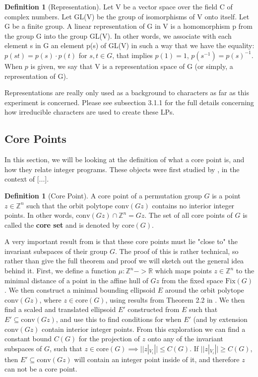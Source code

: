 \documentclass[11pt]{article} %
\theoremstyle{definition}
\newtheorem{definition}[theorem]{Definition}
\theoremstyle{remark}
\newcommand{\ZZ}{\mathbb{Z}}
\newcommand{\RR}{\mathbb{R}}
\begin{document}
\begin{definition} [Representation]
Let V be a vector space over the field C of complex numbers.
Let GL(V) be the group of isomorphisms of V onto itself.
Let G be a finite group.
A linear representation of G in V is a homomorphism p from the group G into the group GL(V). In other words, we associate with each element s in G an element p(s) of GL(V) in such a way that we have the equality: $ p(st) = p(s) \cdot p(t)$ for $s, t \in G$, that implies $p(1) = 1$, $p(s^{-1}) = p(s)^{-1}$. When $p$ is given, we say that V is a representation space of G (or simply, a representation of G).
\end{definition}

Representations are really only used as a background to characters as far as this experiment is concerned. Please see subsection 3.1.1 for the full details concerning how irreducible characters are used to create these LPs.

\subsection{Core Points}

In this section, we will be looking at the definition of what a core point is, and how they relate integer programs. These objects were first studied by \cite{some}, in the context of [...].

\begin{definition}[Core Point]
A core point of a permutation group $G$ is a point $z \in \mathbb{Z}^n$ such that the orbit polytope $\textrm{conv}(Gz)$ contains no interior integer points. In other words, $\textrm{conv}(Gz) \cap \mathbb{Z}^n = Gz$. The set of all core points of $G$ is called the \textbf{core set} and is denoted by $\textrm{core}(G)$.
\end{definition}

A very important result from \cite{rehn} is that these core points must lie "close to" the invariant subspaces of their group $G$. The proof of this is rather technical, so rather than give the full theorem and proof we will sketch out the general idea behind it. First, we define a function $\mu : \ZZ^n -> \RR$ which maps points $z \in \ZZ^n$ to the minimal distance of a point in the affine hull of $Gz$ from the fixed space $\textrm{Fix}(G)$. We then construct a minimal bounding ellipsoid $E$ around the orbit polytope $\textrm{conv}(Gz)$, where $z \in \textrm{core}(G)$, using results from Theorem 2.2 in \cite{barvinok/blekherman}. We then find a scaled and translated ellipsoid $E'$ constructed from $E$ such that $E' \subseteq \textrm{conv}(Gz)$, and use this to find conditions for when $E'$ (and by extension $\textrm{conv}(Gz)$ contain interior integer points. From this exploration we can find a constant bound $C(G)$ for the projection of $z$ onto any of the invariant subspaces of $G$, such that $z \in \textrm{core}(G) \implies  ||z|_{V_i}|| \leq C(G)$. If $||z|_{V_i}|| \geq C(G)$, then $E' \subseteq \textrm{conv}(Gz)$ will contain an integer point inside of it, and therefore $z$ can not be a core point.
\end{document}
